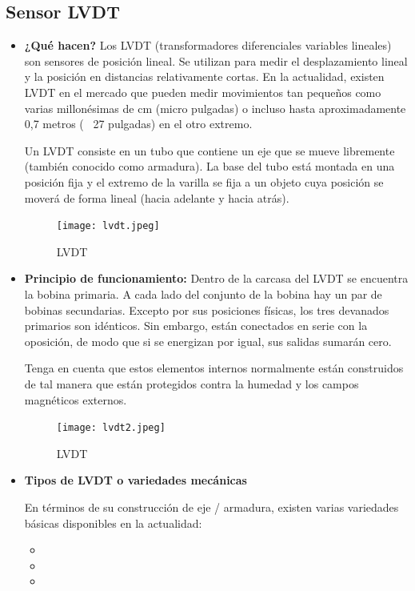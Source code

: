 \subsection*{Sensor LVDT}
\begin{itemize}
	\item \textbf{¿Qué hacen?} Los LVDT (transformadores diferenciales variables lineales) son sensores de posición lineal. Se utilizan para medir el desplazamiento lineal y la posición en distancias relativamente cortas. En la actualidad, existen LVDT en el mercado que pueden medir movimientos tan pequeños como varias millonésimas de cm (micro pulgadas) o incluso hasta aproximadamente 0,7 metros (~ 27 pulgadas) en el otro extremo. \cite{Dewesoft_LVDT} 
	
	Un LVDT consiste en un tubo que contiene un eje que se mueve libremente (también conocido como armadura). La base del tubo está montada en una posición fija y el extremo de la varilla se fija a un objeto cuya posición se moverá de forma lineal (hacia adelante y hacia atrás).
	
	\begin{figure}[h]
		\centering
		{%
			\texttt{[image: lvdt.jpeg]}%
			\caption{LVDT}
			\label{fig:lvdt}
		}
	\end{figure}
	
	\item \textbf{Principio de funcionamiento:} Dentro de la carcasa del LVDT se encuentra la bobina primaria. A cada lado del conjunto de la bobina hay un par de bobinas secundarias. Excepto por sus posiciones físicas, los tres devanados primarios son idénticos. Sin embargo, están conectados en serie con la oposición, de modo que si se energizan por igual, sus salidas sumarán cero.
	
	Tenga en cuenta que estos elementos internos normalmente están construidos de tal manera que están protegidos contra la humedad y los campos magnéticos externos.
	
	\begin{figure}[h]
		\centering
		{%
			\texttt{[image: lvdt2.jpeg]}%
			\caption{LVDT}
			\label{fig:lvdt2}
		}
	\end{figure}
	
	\vspace{15cm}
	
	\item \textbf{Tipos de LVDT o variedades mecánicas}
	
	En términos de su construcción de eje / armadura, existen varias variedades básicas disponibles en la actualidad:
	\begin{itemize}
		\item {} 
		\item {} 
		\item {} 
	\end{itemize}
	

\end{itemize}
